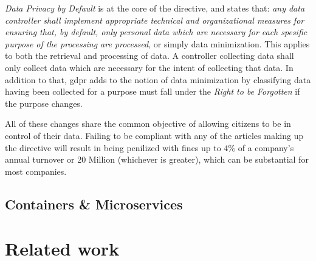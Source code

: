 \documentclass[USenglish]{uit-thesis}
\begin{document}
\textit{Data Privacy by Default} is at the core of the directive, and states
that: \textit{any data controller shall implement appropriate technical and organizational
measures for ensuring that, by default, only personal data which are necessary for each spesific
purpose of the processing are processed}, or simply data minimization.
This applies to both the retrieval and processing of data.
A controller collecting data shall only collect data which are necessary for the intent
of collecting that data.
In addition to that, \gls{gdpr} adds to the notion of data minimization by classifying
data having been collected for a purpose must fall under the \textit{Right to be Forgotten}
if the purpose changes.



All of these changes share the common objective of allowing citizens to
be in control of their data.
Failing to be compliant with any of the articles making up the
directive will result in being penilized with fines up to $ 4\% $ of a company's annual turnover
or 20 Million (whichever is greater), which can be substantial for most companies.
\section{Containers \& Microservices}


\chapter{Related work}
\end{document}
